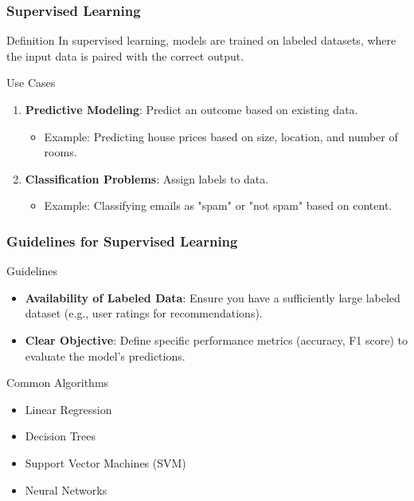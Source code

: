 \documentclass[aspectratio=169]{beamer}
\begin{document}
\begin{frame}[fragile]
    \frametitle{Supervised Learning}
    \begin{block}{Definition}
        In supervised learning, models are trained on labeled datasets, where the input data is paired with the correct output.
    \end{block}
    \begin{block}{Use Cases}
        \begin{enumerate}
            \item \textbf{Predictive Modeling}: Predict an outcome based on existing data.
                \begin{itemize}
                    \item Example: Predicting house prices based on size, location, and number of rooms.
                \end{itemize}
                
            \item \textbf{Classification Problems}: Assign labels to data.
                \begin{itemize}
                    \item Example: Classifying emails as "spam" or "not spam" based on content.
                \end{itemize}
        \end{enumerate}
    \end{block}
\end{frame}

\begin{frame}[fragile]
    \frametitle{Guidelines for Supervised Learning}
    \begin{block}{Guidelines}
        \begin{itemize}
            \item \textbf{Availability of Labeled Data}: Ensure you have a sufficiently large labeled dataset (e.g., user ratings for recommendations).
            \item \textbf{Clear Objective}: Define specific performance metrics (accuracy, F1 score) to evaluate the model's predictions.
        \end{itemize}
    \end{block}
    \begin{block}{Common Algorithms}
        \begin{itemize}
            \item Linear Regression
            \item Decision Trees
            \item Support Vector Machines (SVM)
            \item Neural Networks
        \end{itemize}
    \end{block}
\end{frame}
\end{document}
